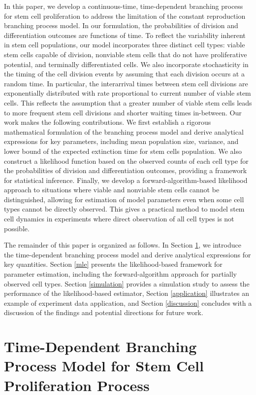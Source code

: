 \documentclass[pdflatex,sn-mathphys-num]{sn-jnl}
\theoremstyle{thmstyleone}%
\theoremstyle{thmstyletwo}%
\theoremstyle{thmstylethree}%
\begin{document}
In this paper, we develop a continuous-time, time-dependent branching process for stem cell proliferation to address the limitation of the constant reproduction branching process model. In our formulation, the probabilities of division and differentiation outcomes are functions of time. To reflect the variability inherent in stem cell populations, our model incorporates three distinct cell types: viable stem cells capable of division, nonviable stem cells that do not have proliferative potential, and terminally differentiated cells. We also incorporate stochasticity in the timing of the cell division events by assuming that each division occurs at a random time. In particular, the
interarrival times between stem cell divisions are exponentially distributed with rate proportional to current number of viable stem cells. This reflects the assumption that a greater number of viable stem cells leads to more frequent stem cell divisions and shorter waiting times in-between. Our work makes the following contributions. We first establish a rigorous mathematical formulation of the branching process model and derive analytical expressions for key parameters, including mean population size, variance, and lower bound of the expected extinction time for stem cells population. We also construct a likelihood function based on the observed counts of each cell type for the probabilities of division and differentiation outcomes, providing a framework for statistical inference. Finally, we develop a forward-algorithm-based likelihood approach to situations where viable and nonviable stem cells cannot be distinguished, allowing for estimation of model parameters even when some cell types cannot be directly observed. This gives a practical method to model stem cell dynamics in experiments where direct observation of all cell types is not possible.

The remainder of this paper is organized as follows. In Section \ref{model}, we introduce the time-dependent branching process model and derive analytical expressions for key quantities. Section \ref{mle} presents the likelihood-based framework for parameter estimation, including the forward-algorithm approach for partially observed cell types. Section \ref{simulation} provides a simulation study to assess the performance of the likelihood-based estimator, Section \ref{application} illustrates an example of experiment data application, and Section \ref{discussion} concludes with a discussion of the findings and potential directions for future work.

\section{Time-Dependent Branching Process Model for Stem Cell Proliferation Process}\label{model}
\end{document}
